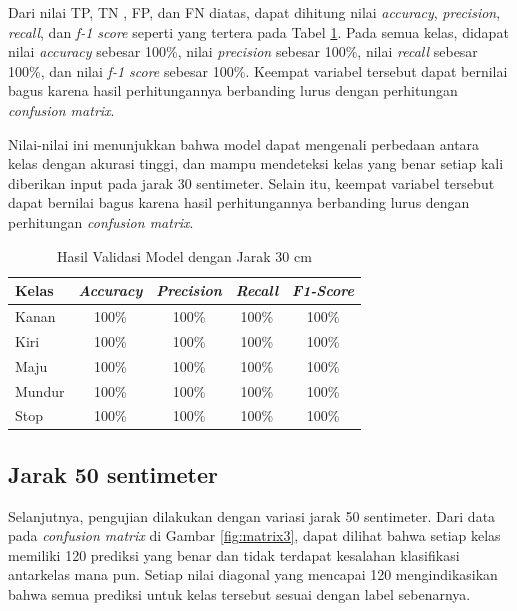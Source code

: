 Dari nilai TP, TN , FP, dan FN diatas, dapat dihitung nilai \emph{accuracy}, \emph{precision}, \emph{recall}, dan \emph{f-1 score} seperti yang tertera pada Tabel \ref{tb:vs_model2}. Pada semua kelas, didapat nilai \emph{accuracy} sebesar 100\%, nilai \emph{precision} sebesar 100\%, nilai \emph{recall} sebesar 100\%, dan nilai \emph{f-1 score} sebesar 100\%. Keempat variabel tersebut dapat bernilai bagus karena hasil perhitungannya berbanding lurus dengan perhitungan \emph{confusion matrix}. 

Nilai-nilai ini menunjukkan bahwa model dapat mengenali perbedaan antara kelas dengan akurasi tinggi, dan mampu mendeteksi kelas yang benar setiap kali diberikan input pada jarak 30 sentimeter. Selain itu, keempat variabel tersebut dapat bernilai bagus karena hasil perhitungannya berbanding lurus dengan perhitungan \emph{confusion matrix}. 

\begin{longtable}{|l|c|c|c|c|}
  \caption{Hasil Validasi Model dengan Jarak 30 cm}
  \label{tb:vs_model2} \\
  \hline
  \rowcolor[HTML]{C0C0C0} 
  \textbf{Kelas} & \textbf{\emph{Accuracy}} & \textbf{\emph{Precision}} & \textbf{\emph{Recall}} & \textbf{\emph{F1-Score}} \\ \hline
  Kanan    & 100\%            & 100\%             & 100\%           & 100\%            \\ \hline
  Kiri     & 100\%          & 100\%           & 100\%           & 100\%           \\ \hline
  Maju      & 100\%          & 100\%           & 100\%          & 100\%          \\ \hline
  Mundur     & 100\%            & 100\%             & 100\%           & 100\%            \\ \hline
  Stop  & 100\%            & 100\%             & 100\%           & 100\%            \\ \hline
\end{longtable}

\subsection{Jarak 50 sentimeter}

Selanjutnya, pengujian dilakukan dengan variasi jarak 50 sentimeter. Dari data pada \emph{confusion matrix} di Gambar \ref{fig:matrix3}, dapat dilihat bahwa setiap kelas memiliki 120 prediksi yang benar dan tidak terdapat kesalahan klasifikasi antarkelas mana pun. Setiap nilai diagonal yang mencapai 120 mengindikasikan bahwa semua prediksi untuk kelas tersebut sesuai dengan label sebenarnya. 

